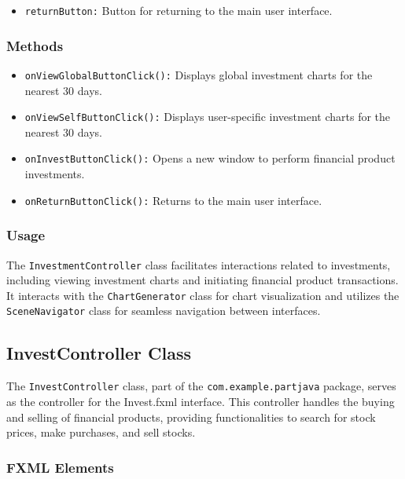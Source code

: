 \documentclass{article}
\begin{document}
\begin{itemize}
    \item \texttt{returnButton:} Button for returning to the main user interface.
\end{itemize}

\subsubsection{Methods}

\begin{itemize}
    \item \texttt{onViewGlobalButtonClick():} Displays global investment charts for the nearest 30 days.
    \item \texttt{onViewSelfButtonClick():} Displays user-specific investment charts for the nearest 30 days.
    \item \texttt{onInvestButtonClick():} Opens a new window to perform financial product investments.
    \item \texttt{onReturnButtonClick():} Returns to the main user interface.
\end{itemize}

\subsubsection{Usage}

The \texttt{InvestmentController} class facilitates interactions related to investments, including viewing investment charts and initiating financial product transactions. It interacts with the \texttt{ChartGenerator} class for chart visualization and utilizes the \texttt{SceneNavigator} class for seamless navigation between interfaces.

\subsection*{InvestController Class}

The \texttt{InvestController} class, part of the \texttt{com.example.partjava} package, serves as the controller for the Invest.fxml interface. This controller handles the buying and selling of financial products, providing functionalities to search for stock prices, make purchases, and sell stocks.

\subsubsection*{FXML Elements}
\end{document}
